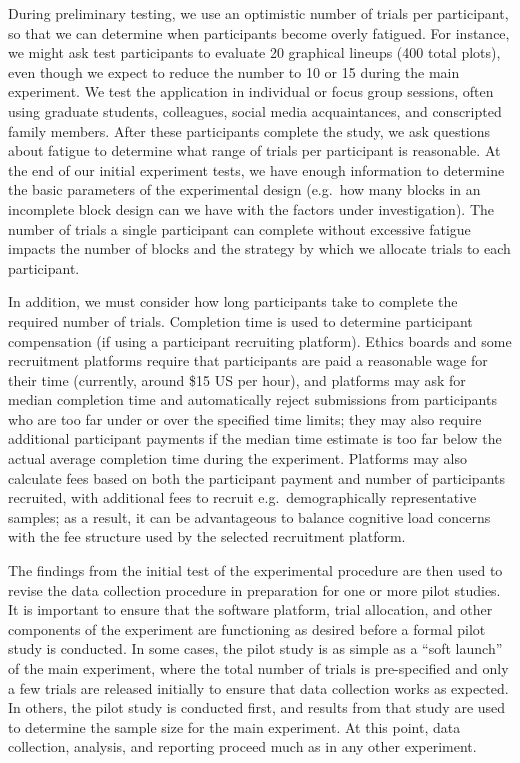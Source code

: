 \documentclass[
  10pt,
]{article}
\begin{document}
During preliminary testing, we use an optimistic number of trials per
participant, so that we can determine when participants become overly
fatigued. For instance, we might ask test participants to evaluate 20
graphical lineups (400 total plots), even though we expect to reduce the
number to 10 or 15 during the main experiment. We test the application
in individual or focus group sessions, often using graduate students,
colleagues, social media acquaintances, and conscripted family members.
After these participants complete the study, we ask questions about
fatigue to determine what range of trials per participant is reasonable.
At the end of our initial experiment tests, we have enough information
to determine the basic parameters of the experimental design (e.g.~how
many blocks in an incomplete block design can we have with the factors
under investigation). The number of trials a single participant can
complete without excessive fatigue impacts the number of blocks and the
strategy by which we allocate trials to each participant.

In addition, we must consider how long participants take to complete the
required number of trials. Completion time is used to determine
participant compensation (if using a participant recruiting platform).
Ethics boards and some recruitment platforms require that participants
are paid a reasonable wage for their time (currently, around \$15 US per
hour), and platforms may ask for median completion time and
automatically reject submissions from participants who are too far under
or over the specified time limits; they may also require additional
participant payments if the median time estimate is too far below the
actual average completion time during the experiment. Platforms may also
calculate fees based on both the participant payment and number of
participants recruited, with additional fees to recruit
e.g.~demographically representative samples; as a result, it can be
advantageous to balance cognitive load concerns with the fee structure
used by the selected recruitment platform.

The findings from the initial test of the experimental procedure are
then used to revise the data collection procedure in preparation for one
or more pilot studies. It is important to ensure that the software
platform, trial allocation, and other components of the experiment are
functioning as desired before a formal pilot study is conducted. In some
cases, the pilot study is as simple as a ``soft launch'' of the main
experiment, where the total number of trials is pre-specified and only a
few trials are released initially to ensure that data collection works
as expected. In others, the pilot study is conducted first, and results
from that study are used to determine the sample size for the main
experiment. At this point, data collection, analysis, and reporting
proceed much as in any other experiment.
\end{document}
